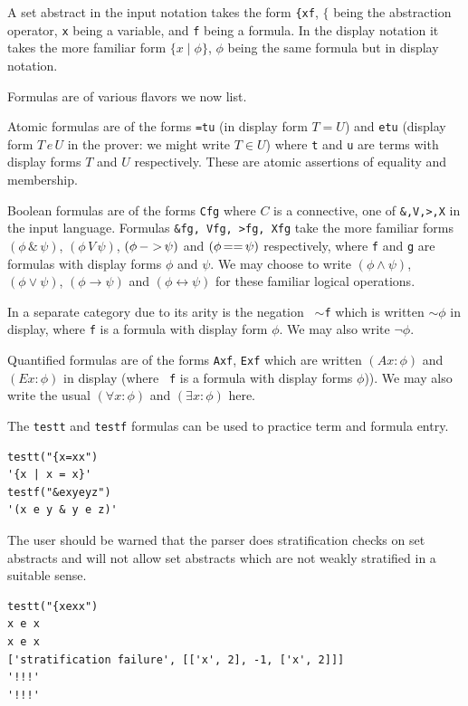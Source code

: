 \documentclass[12pt]{article}
\begin{document}
A set abstract in the input notation takes the form {\tt \{xf},
$\{$ being the abstraction operator, {\tt x} being a variable,
and {\tt f} being a formula. In the display notation it takes
the more familiar form $\{x \mid \phi\}$, $\phi$ being the same
formula but in display notation.

Formulas are of various flavors we now list.

Atomic formulas are of the forms {\tt =tu} (in display form $T =
U$) and {\tt etu} (display form $T \,e \,U$ in the prover: we
might write $T \in U$) where {\tt t} and {\tt u} are terms with
display forms $T$ and $U$ respectively. These are atomic
assertions of equality and membership.

Boolean formulas are of the forms {\tt Cfg} where $C$ is a
connective, one of {\tt \&,V,>,X} in the input language.
Formulas {\tt \&fg, Vfg, >fg, Xfg} take the more familiar forms
$(\phi \, \& \, \psi)$, $(\phi \,V\, \psi)$,
$(\phi\, {\tt ->}\, \psi)$ and $(\phi \,{\tt ==}\, \psi)$
respectively, where {\tt f} and {\tt g} are formulas with
display forms $\phi$ and $\psi$. We may choose to write $(\phi
\wedge \psi)$, $(\phi \vee \psi)$, $(\phi \rightarrow \psi)$ and
$(\phi \leftrightarrow \psi)$ for these familiar logical
operations.

In a separate category due to its arity is the negation {\tt
$\sim$f} which is written $\sim \phi$ in display, where {\tt f}
is a formula with display form $\phi$. We may also write $\neg
\phi$.

Quantified formulas are of the forms {\tt Axf}, {\tt Exf} which
are written $(Ax:\phi)$ and $(Ex:\phi)$ in display (where {\tt
f} is a formula with display forms $\phi$)). We may also write
the usual
$(\forall x:\phi)$ and $(\exists x:\phi)$ here.

The {\tt testt} and {\tt testf} formulas can be used to practice
term and formula entry.

\begin{verbatim}
testt("{x=xx")
'{x | x = x}'
testf("&exyeyz")
'(x e y & y e z)'
\end{verbatim}

The user should be warned that the parser does stratification
checks on set abstracts and will not allow set abstracts which
are not weakly stratified in a suitable sense.
{\small
\begin{verbatim}
testt("{xexx")
x e x
x e x
['stratification failure', [['x', 2], -1, ['x', 2]]]
'!!!'
'!!!'
\end{verbatim}}
\end{document}
